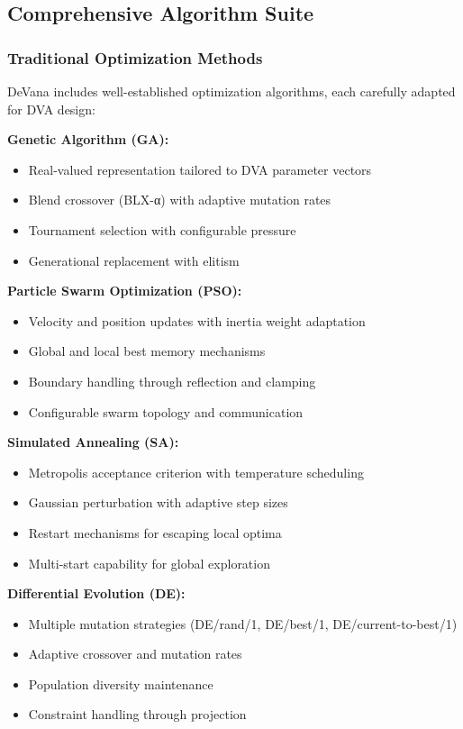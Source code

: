 \documentclass[12pt,a4paper]{article}
\newcommand{\softwareName}{DeVana}
\begin{document}
\subsection{Comprehensive Algorithm Suite}

\subsubsection{Traditional Optimization Methods}

\softwareName{} includes well-established optimization algorithms, each carefully adapted for DVA design:

\textbf{Genetic Algorithm (GA):}
\begin{itemize}
    \item Real-valued representation tailored to DVA parameter vectors
    \item Blend crossover (BLX-α) with adaptive mutation rates
    \item Tournament selection with configurable pressure
    \item Generational replacement with elitism
\end{itemize}

\textbf{Particle Swarm Optimization (PSO):}
\begin{itemize}
    \item Velocity and position updates with inertia weight adaptation
    \item Global and local best memory mechanisms
    \item Boundary handling through reflection and clamping
    \item Configurable swarm topology and communication
\end{itemize}

\textbf{Simulated Annealing (SA):}
\begin{itemize}
    \item Metropolis acceptance criterion with temperature scheduling
    \item Gaussian perturbation with adaptive step sizes
    \item Restart mechanisms for escaping local optima
    \item Multi-start capability for global exploration
\end{itemize}

\textbf{Differential Evolution (DE):}
\begin{itemize}
    \item Multiple mutation strategies (DE/rand/1, DE/best/1, DE/current-to-best/1)
    \item Adaptive crossover and mutation rates
    \item Population diversity maintenance
    \item Constraint handling through projection
\end{itemize}
\end{document}
